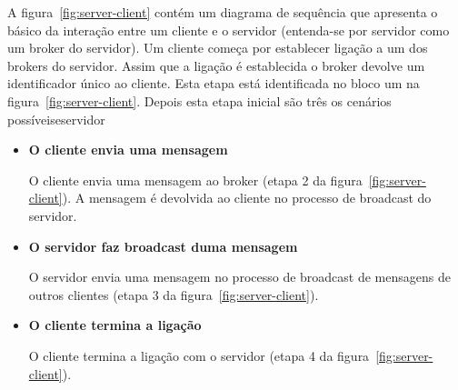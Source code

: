 A figura~\ref{fig:server-client} contém um diagrama de sequência que apresenta o básico da interação entre um cliente e o servidor (entenda-se por servidor como um broker do servidor).
Um cliente começa por establecer ligação a um dos brokers do servidor. Assim que a ligação é establecida o broker devolve um identificador único ao cliente. Esta etapa está identificada no bloco um na figura~\ref{fig:server-client}. Depois esta etapa inicial são três os cenários possíveiseservidor

\begin{itemize}
\item
\textbf{O cliente envia uma mensagem}

O cliente envia uma mensagem ao broker (etapa 2 da figura~\ref{fig:server-client}). A mensagem é devolvida ao cliente no processo de broadcast do servidor. 

\item
\textbf{O servidor faz broadcast duma mensagem}

O servidor envia uma mensagem no processo de broadcast de mensagens de outros clientes (etapa 3 da figura~\ref{fig:server-client}).

\item
\textbf{O cliente termina a ligação}

O cliente termina a ligação com o servidor (etapa 4 da figura~\ref{fig:server-client}).
\end{itemize}
